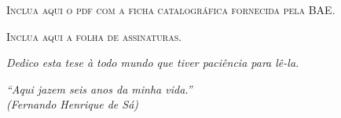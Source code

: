 \imprimircapa


\setcounter{page}{3}
\imprimirfolhaderosto*


\begin{fichacatalografica}
    \vspace*{\fill}
    \begin{center}
        \textsc{Inclua aqui o pdf com a ficha catalográfica fornecida pela BAE.}
    \end{center}
    \vspace*{\fill}
\end{fichacatalografica}


\newpage
\vspace*{\fill}
\begin{center}
    \textsc{Inclua aqui a folha de assinaturas.}
\end{center}
\vspace*{\fill}
\newpage
%
\cleardoublepage


\begin{dedicatoria}
    \vspace*{\fill}
    \centering
    \noindent
    \textit{Dedico esta tese à todo mundo que tiver paciência para lê-la.}
    \vspace*{\fill}
\end{dedicatoria}

\begin{agradecimentos}
    \lipsum[1-4]
\end{agradecimentos}

\begin{epigrafe}
    \vspace*{\fill}
    \begin{flushright}
        \textit{``Aqui jazem seis anos da minha vida.''\\
        (Fernando Henrique de Sá)}
    \end{flushright}
\end{epigrafe}

